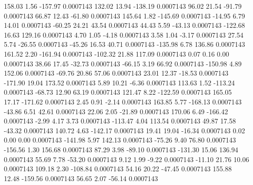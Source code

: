       158.03        1.56     -157.97     0.0007143
      132.02       13.94     -138.19     0.0007143
       96.02       21.54      -91.79     0.0007143
       66.87       12.43      -61.80     0.0007143
      145.64        1.82     -145.69     0.0007143
      -14.95        6.79       14.01     0.0007143
      -60.25       24.21       43.54     0.0007143
       44.43        5.59      -43.13     0.0007143
     -122.68       16.63      129.16     0.0007143
        4.70        1.05       -4.18     0.0007143
        3.58        1.04       -3.17     0.0007143
       27.54        5.74      -26.55     0.0007143
      -45.26       16.53       40.71     0.0007143
     -135.98        6.78      136.86     0.0007143
      161.52        2.20     -161.94     0.0007143
     -102.32       21.88      117.09     0.0007143
        0.07        0.16        0.00     0.0007143
       38.66       17.45      -32.73     0.0007143
      -66.15        3.19       66.92     0.0007143
     -150.98        4.89      152.06     0.0007143
      -69.76       20.86       57.06     0.0007143
       23.01       12.37      -18.53     0.0007143
     -171.90       19.04      173.52     0.0007143
        5.89       10.21       -6.36     0.0007143
      113.63        1.52     -113.24     0.0007143
      -68.73       12.90       63.19     0.0007143
      121.47        8.22     -122.59     0.0007143
      165.05       17.17     -171.62     0.0007143
        2.45        0.91       -2.14     0.0007143
      163.85        5.77     -168.13     0.0007143
      -43.86        6.51       42.61     0.0007143
       22.06        2.05      -21.89     0.0007143
      170.06        6.49     -166.42     0.0007143
       -2.99        4.17        3.73     0.0007143
     -113.47        4.04      113.54     0.0007143
       49.87       17.58      -43.32     0.0007143
      140.72        4.63     -142.17     0.0007143
       19.41       19.04      -16.34     0.0007143
        0.02        0.00        0.00     0.0007143
     -141.98        5.97      142.13     0.0007143
      -75.26        9.40       76.80     0.0007143
     -156.56        1.30      156.68     0.0007143
       87.29        3.98      -89.10     0.0007143
     -131.30       15.06      136.94     0.0007143
       55.69        7.78      -53.20     0.0007143
        9.12        1.99       -9.22     0.0007143
      -11.10       21.76       10.06     0.0007143
      109.18        2.30     -108.84     0.0007143
       54.16       20.22      -47.45     0.0007143
      155.88       12.48     -159.56     0.0007143
       56.65        2.07      -56.14     0.0007143
